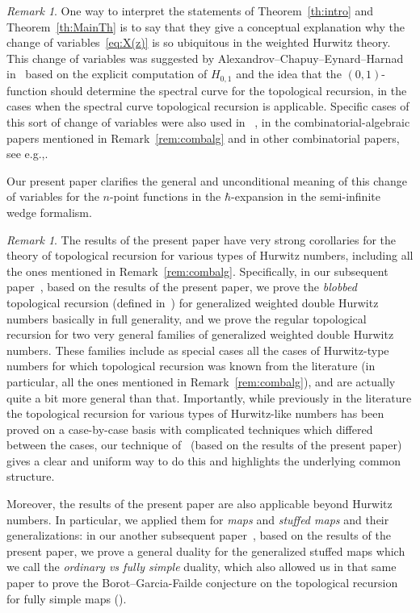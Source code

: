 \documentclass[11pt]{article}
\newcommand{\eg}{e.g.,\xspace}
\theoremstyle{plain}
\theoremstyle{definition}
\theoremstyle{remark}
\newtheorem{remark}[theorem]{Remark}
\begin{document}
\begin{remark} One way to interpret the statements of Theorem~\ref{th:intro} and Theorem~\ref{th:MainTh} is to say that they give a conceptual explanation why the change of variables~\eqref{eq:X(z)} is so ubiquitous in the weighted Hurwitz theory. This change of variables was suggested by Alexandrov--Chapuy--Eynard--Harnad in~\cite{ACEH-1} based on the explicit computation of $H_{0,1}$ and the idea that the $(0,1)$-function should determine the spectral curve for the topological recursion, in the cases when the spectral curve topological recursion is applicable. Specific cases of this sort of change of variables were also used in ~\cite{ACEHferm}, in the combinatorial-algebraic papers mentioned in Remark~\ref{rem:combalg} and in other combinatorial papers, see \eg \cite{chapuy2009asymptotic}.

Our present paper clarifies the general and unconditional meaning of this change of variables for the $n$-point functions in the $\hbar$-expansion in the semi-infinite wedge formalism.
\end{remark}

\begin{remark}\label{rem:toprec}
The results of the present paper have very strong corollaries for the theory of topological recursion for various types of Hurwitz numbers, including all the ones mentioned in Remark~\ref{rem:combalg}. Specifically, in our subsequent paper~\cite{BDKS21toprec}, based on the results of the present paper, we prove the \emph{blobbed} topological recursion (defined in~\cite{BS17}) for generalized weighted double Hurwitz numbers basically in full generality, and we prove the regular topological recursion for two very general families of generalized weighted double Hurwitz numbers. These families include as special cases all the cases of Hurwitz-type numbers for which topological recursion was known from the literature (in particular, all the ones mentioned in Remark~\ref{rem:combalg}), and are actually quite a bit more general than that. Importantly, while previously in the literature the topological recursion for various types of Hurwitz-like numbers has been proved on a case-by-case basis with complicated techniques which differed between the cases, our technique of~\cite{BDKS21toprec} (based on the results of the present paper) gives a clear and uniform way to do this and highlights the underlying common structure.

Moreover, the results of the present paper are also applicable beyond Hurwitz numbers. In particular, we applied them for \emph{maps} and \emph{stuffed maps} and their generalizations: in our another subsequent paper~\cite{BDKS21fully}, based on the results of the present paper, we prove a general duality for the generalized stuffed maps which we call the \emph{ordinary vs fully simple} duality, which also allowed us in that same paper to prove the Borot--Garcia-Failde conjecture on the topological recursion for fully simple maps (\cite[Conj.\,5.3]{borot2018simple}).
\end{remark}
\end{document}
